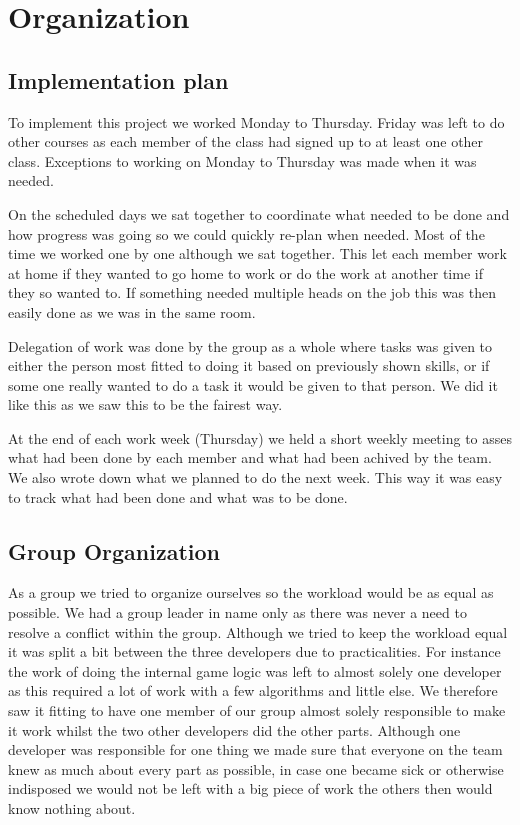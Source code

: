 \section{Organization}
\label{sec:organization}

\subsection{Implementation plan}
\label{subsec:implementation_plan}
To implement this project we worked Monday to Thursday.
Friday was left to do other courses as each member of the class had signed up to at least one other class.
Exceptions to working on Monday to Thursday was made when it was needed.

On the scheduled days we sat together to coordinate what needed to be done and how progress was going so we could quickly re-plan when needed.
Most of the time we worked one by one although we sat together.
This let each member work at home if they wanted to go home to work or do the work at another time if they so wanted to.
If something needed multiple heads on the job this was then easily done as we was in the same room.

Delegation of work was done by the group as a whole where tasks was given to either the person most fitted to doing it based on previously shown skills, or if some one really wanted to do a task it would be given to that person. We did it like this as we saw this to be the fairest way.

At the end of each work week (Thursday) we held a short weekly meeting to asses what had been done by each member and what had been achived by the team.
We also wrote down what we planned to do the next week.
This way it was easy to track what had been done and what was to be done.

\subsection{Group Organization}
\label{subsec:group_organization}
As a group we tried to organize ourselves so the workload would be as equal as possible. 
We had a group leader in name only as there was never a need to resolve a conflict within the group.
Although we tried to keep the workload equal it was split a bit between the three developers due to practicalities. 
For instance the work of doing the internal game logic was left to almost solely one developer as this required a lot of work with a few algorithms and little else.
We therefore saw it fitting to have one member of our group almost solely responsible to make it work whilst the two other developers did the other parts.
Although one developer was responsible for one thing we made sure that everyone on the team knew as much about every part as possible, in case one became sick or otherwise indisposed we would not be left with a big piece of work the others then would know nothing about.


